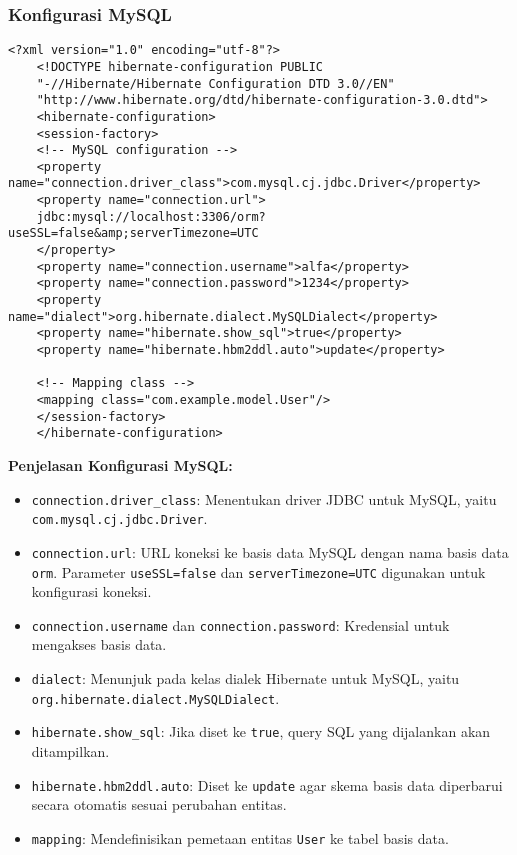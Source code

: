 \subsubsection*{Konfigurasi MySQL}
\begin{lstlisting}[style=XmlStyle]
	<?xml version="1.0" encoding="utf-8"?>
	<!DOCTYPE hibernate-configuration PUBLIC 
	"-//Hibernate/Hibernate Configuration DTD 3.0//EN"
	"http://www.hibernate.org/dtd/hibernate-configuration-3.0.dtd">
	<hibernate-configuration>
	<session-factory>
	<!-- MySQL configuration -->
	<property name="connection.driver_class">com.mysql.cj.jdbc.Driver</property>
	<property name="connection.url">
	jdbc:mysql://localhost:3306/orm?useSSL=false&amp;serverTimezone=UTC
	</property>
	<property name="connection.username">alfa</property>
	<property name="connection.password">1234</property>
	<property name="dialect">org.hibernate.dialect.MySQLDialect</property>
	<property name="hibernate.show_sql">true</property>
	<property name="hibernate.hbm2ddl.auto">update</property>
	
	<!-- Mapping class -->
	<mapping class="com.example.model.User"/>
	</session-factory>
	</hibernate-configuration>
\end{lstlisting}

\textbf{Penjelasan Konfigurasi MySQL:}
\begin{itemize}
	\item \texttt{connection.driver\_class}: Menentukan driver JDBC untuk MySQL, yaitu \texttt{com.mysql.cj.\-jdbc.Driver}.
	\item \texttt{connection.url}: URL koneksi ke basis data MySQL dengan nama basis data \texttt{orm}. Parameter \texttt{useSSL=false} dan \texttt{serverTimezone=UTC} digunakan untuk konfigurasi koneksi.
	\item \texttt{connection.username} dan \texttt{connection.password}: Kredensial untuk mengakses basis data.
	\item \texttt{dialect}: Menunjuk pada kelas dialek Hibernate untuk MySQL, yaitu \texttt{org.hibernate.\-dialect.\-MySQLDialect}.
	\item \texttt{hibernate.show\_sql}: Jika diset ke \texttt{true}, query SQL yang dijalankan akan ditampilkan.
	\item \texttt{hibernate.hbm2ddl.auto}: Diset ke \texttt{update} agar skema basis data diperbarui secara otomatis sesuai perubahan entitas.
	\item \texttt{mapping}: Mendefinisikan pemetaan entitas \texttt{User} ke tabel basis data.
\end{itemize}

